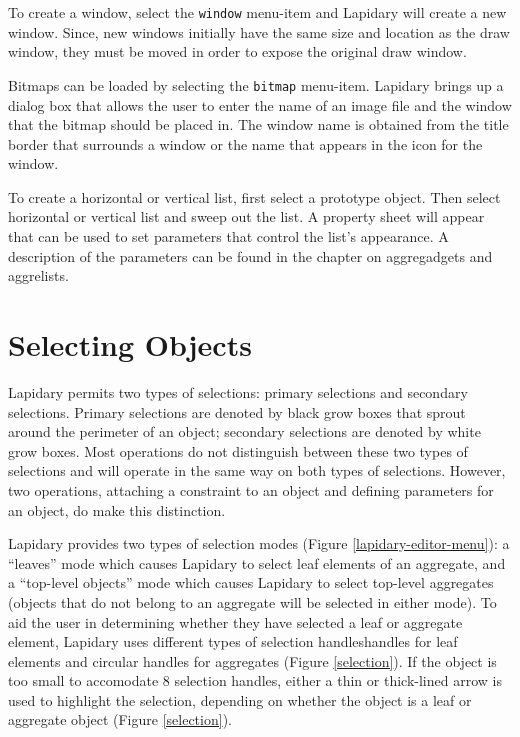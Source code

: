 To create a window, select the {\tt window} menu-item and Lapidary will
create a new window.  Since, new windows initially have the same
size and location as the draw window,
they must be moved in order to expose the original draw window.

Bitmaps can be loaded by selecting the {\tt bitmap} menu-item. Lapidary
brings up a dialog box that allows the user to enter the name of an image file
and the window that the bitmap should be placed in.  The window name
is obtained from the title border that surrounds a window or the name
that appears in the icon for the window.

To create a horizontal or vertical list, first select a prototype
object.  Then select horizontal or vertical list and sweep out the list.
A property sheet will appear that can be used to set parameters that
control the list's appearance.  A description of the parameters can
be found in the chapter on aggregadgets and aggrelists.


\section{Selecting Objects}
Lapidary permits two types of selections: primary selections and secondary
selections.
Primary selections are denoted by black grow boxes that sprout around the
perimeter of an object; secondary selections are denoted by white grow
boxes.  Most operations do not distinguish between these two types of
selections and will operate in the same way on both types of selections.
However, two operations, attaching a constraint to an object and
defining parameters for an object, do make this distinction.

Lapidary provides two types of selection modes (Figure
\ref{lapidary-editor-menu}): a ``leaves'' mode
which causes Lapidary to select leaf
elements of an aggregate, and a ``top-level objects'' mode which causes
Lapidary to select top-level aggregates (objects that do not belong to an
aggregate will be selected in either mode).
To aid the user in determining whether they have selected a leaf or
aggregate element, Lapidary uses different types of selection
handles\dashrectangular handles for leaf elements
and circular
handles for aggregates (Figure \ref{selection}).
If the object is too small to
accomodate 8 selection handles, either a thin or thick-lined arrow is used
to highlight the selection,
depending on whether the object is
a leaf or aggregate object (Figure \ref{selection}).

